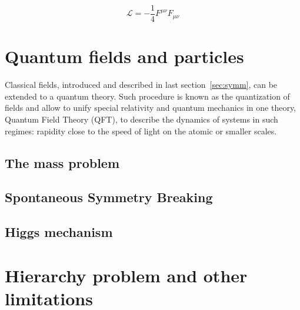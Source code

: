 \begin{equation}
  \label{eq:electrolagran}
  \mathcal{L}=-\frac{1}{4}F^{\mu\nu}F_{\mu\nu}
\end{equation}

\section{Quantum fields and particles}
\label{sec:fields}

Classical fields, introduced and described in last section~\ref{sec:symm}, can be extended to a quantum theory. Such procedure is known as the quantization of fields and allow to unify special relativity and quantum mechanics in one theory, Quantum Field Theory (QFT), to describe the dynamics of systems in such regimes: rapidity close to the speed of light on the atomic or smaller scales. 

\subsection{The mass problem}
\label{sec:mass}

\subsection{Spontaneous Symmetry Breaking}
\label{sec:SSB}

\subsection{Higgs mechanism}
\label{sec:higgs}

\section{Hierarchy problem and other limitations}
\label{sec:hier}

